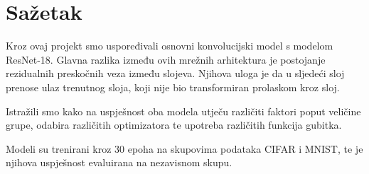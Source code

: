 \chapter{Sažetak}

Kroz ovaj projekt smo uspoređivali osnovni konvolucijski model s modelom ResNet-18. Glavna razlika između ovih mrežnih arhitektura je postojanje rezidualnih preskočnih veza između slojeva. Njihova uloga je da u sljedeći sloj prenose ulaz trenutnog sloja, koji nije bio transformiran prolaskom kroz sloj. 

Istražili smo kako na uspješnost oba modela utječu različiti faktori poput veličine grupe, odabira različitih optimizatora te upotreba različitih funkcija gubitka. 

Modeli su trenirani kroz 30 epoha na skupovima podataka CIFAR i MNIST, te je njihova uspješnost evaluirana na nezavisnom skupu.